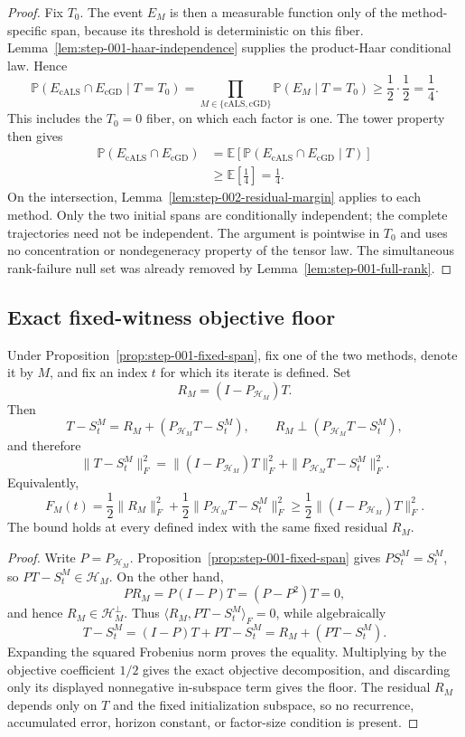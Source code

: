\begin{proof}
Fix $T_0$.  The event $E_M$ is then a measurable function only of the
method-specific span, because its threshold is deterministic on this fiber.
Lemma~\ref{lem:step-001-haar-independence} supplies the product-Haar
conditional law.  Hence
\[
 \mathbb P(E_{\mathrm{cALS}}\cap E_{\mathrm{cGD}}\mid T=T_0)
 =\prod_{M\in\{\mathrm{cALS},\mathrm{cGD}\}}
 \mathbb P(E_M\mid T=T_0)
 \ge\frac12\cdot\frac12=\frac14.
\]
This includes the $T_0=0$ fiber, on which each factor is one.  The tower
property then gives
\[
 \begin{aligned}
 \mathbb P(E_{\mathrm{cALS}}\cap E_{\mathrm{cGD}})
 &=\mathbb E\!\left[
 \mathbb P(E_{\mathrm{cALS}}\cap E_{\mathrm{cGD}}\mid T)\right]\\
 &\ge\mathbb E\!\left[\frac14\right]=\frac14.
 \end{aligned}
\]
On the intersection, Lemma~\ref{lem:step-002-residual-margin} applies to
each method.  Only the two initial spans are conditionally independent; the
complete trajectories need not be independent.  The argument is pointwise in
$T_0$ and uses no concentration or nondegeneracy property of the tensor law.
The simultaneous rank-failure null set was already removed by
Lemma~\ref{lem:step-001-full-rank}.
\end{proof}

\subsection{Exact fixed-witness objective floor}\label{app:step-003}

\begin{proposition}\label{prop:step-003-pythagorean-floor}
Under Proposition~\ref{prop:step-001-fixed-span}, fix one of the two methods,
denote it by $M$, and fix an index $t$ for which its iterate is defined.  Set
\[
 R_M=(I-P_{\mathcal H_M})T.
\]
Then
\[
 T-S_t^M=R_M+(P_{\mathcal H_M}T-S_t^M),
 \qquad
 R_M\perp(P_{\mathcal H_M}T-S_t^M),
\]
and therefore
\[
 \|T-S_t^M\|_F^2
 =\|(I-P_{\mathcal H_M})T\|_F^2
 +\|P_{\mathcal H_M}T-S_t^M\|_F^2.
\]
Equivalently,
\[
 F_M(t)=\frac12\|R_M\|_F^2
 +\frac12\|P_{\mathcal H_M}T-S_t^M\|_F^2
 \ge\frac12\|(I-P_{\mathcal H_M})T\|_F^2.
\]
The bound holds at every defined index with the same fixed residual $R_M$.
\end{proposition}

\begin{proof}
Write $P=P_{\mathcal H_M}$.  Proposition~\ref{prop:step-001-fixed-span}
gives $PS_t^M=S_t^M$, so $PT-S_t^M\in\mathcal H_M$.  On the other hand,
\[
 PR_M=P(I-P)T=(P-P^2)T=0,
\]
and hence $R_M\in\mathcal H_M^\perp$.  Thus
$\langle R_M,PT-S_t^M\rangle_F=0$, while algebraically
\[
 T-S_t^M=(I-P)T+PT-S_t^M=R_M+(PT-S_t^M).
\]
Expanding the squared Frobenius norm proves the equality.  Multiplying by the
objective coefficient $1/2$ gives the exact objective decomposition, and
discarding only its displayed nonnegative in-subspace term gives the floor.
The residual $R_M$ depends only on $T$ and the fixed initialization subspace,
so no recurrence, accumulated error, horizon constant, or factor-size
condition is present.
\end{proof}

